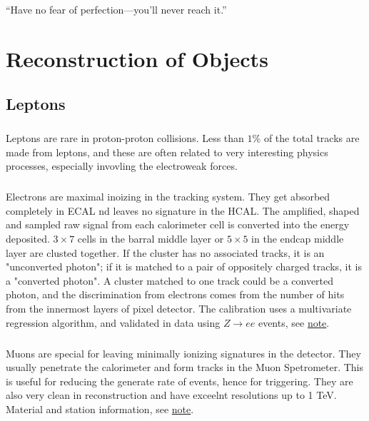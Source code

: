 \begin{savequote}[75mm]
“Have no fear of perfection—you’ll never reach it.”
\end{savequote}

\chapter{Reconstruction of Objects}

\section{Leptons}
\paragraph{}
Leptons are rare in proton-proton collisions. Less than $1\%$ of the total tracks are made from leptons, and these are often related to very interesting physics processes, especially invovling the electroweak forces.

\paragraph{}
Electrons are maximal inoizing in the tracking system. They get absorbed completely in ECAL nd leaves no signature in the HCAL. The amplified, shaped and sampled raw signal from each calorimeter cell is converted into the energy deposited. $3\times 7$ cells in the barral middle layer or $ 5 \times 5$ in the endcap middle layer are clusted together. If the cluster has no associated tracks, it is an "unconverted photon"; if it is matched to a pair of oppositely charged tracks, it is a "converted photon". A cluster matched to one track could be a converted photon, and the discrimination from electrons comes from the number of hits from the innermost layers of pixel detector. The calibration uses a multivariate regression algorithm, and validated in data using $Z \to ee$ events, see \href{https://atlas.web.cern.ch/Atlas/GROUPS/PHYSICS/PUBNOTES/ATL-PHYS-PUB-2016-015/}{note}.

\paragraph{}
Muons are special for leaving minimally ionizing signatures in the detector. They usually penetrate the calorimeter and form tracks in the Muon Spetrometer. This is useful for reducing the generate rate of events, hence for triggering. They are also very clean in reconstruction and have exceelnt resolutions up to 1 TeV. Material and station information, see \href{https://cds.cern.ch/record/2252613/files/ATL-COM-MUON-2017-005.pdf}{note}.

